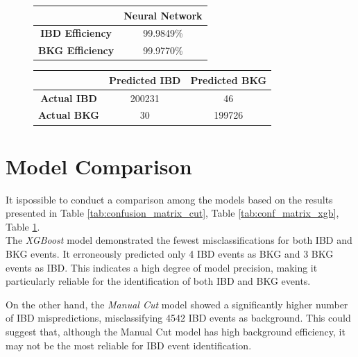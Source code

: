 \begin{figure}[h]
	\centering
	\small
	\hspace{-3cm}
	\begin{minipage}{0.3\textwidth}
		\centering
		\begin{tabular}{cc}
			\toprule
			& \textbf{Neural Network} \\
			\midrule
			\textbf{IBD Efficiency} & 99.9849\% \\
			\textbf{BKG Efficiency} & 99.9770\% \\
			\bottomrule
		\end{tabular}
	\end{minipage}
\hspace{2cm}
	\begin{minipage}{0.5\textwidth}
		\centering
		\begin{tabular}{ccc}
			\toprule
			& \textbf{Predicted IBD} & \textbf{Predicted BKG} \\
			\midrule
			\textbf{Actual IBD} & 200231 & 46 \\
			\textbf{Actual BKG} & 30 & 199726 \\
			\bottomrule
		\end{tabular}
		\label{tab:conf_matrix_nn}
	\end{minipage}
\hspace{-1cm}
\end{figure}


\section{Model Comparison}
It ispossible to conduct a comparison among the models based on the results presented in Table \ref{tab:confusion_matrix_cut}, Table \ref{tab:conf_matrix_xgb}, Table \ref{tab:conf_matrix_nn}.\\
The \textit{XGBoost} model demonstrated the fewest misclassifications for both IBD and BKG events. It erroneously predicted only 4 IBD events as BKG and 3 BKG events as IBD. This indicates a high degree of model precision, making it particularly reliable for the identification of both IBD and BKG events.

On the other hand, the \textit{Manual Cut} model showed a significantly higher number of IBD mispredictions, misclassifying 4542 IBD events as background. This could suggest that, although the Manual Cut model has high background efficiency, it may not be the most reliable for IBD event identification.

